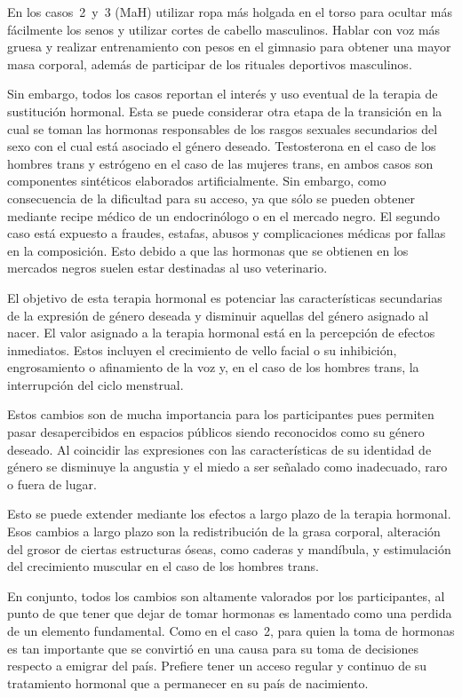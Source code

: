 En los casos~2~y~3 (MaH) utilizar ropa más holgada en el torso para ocultar más
fácilmente los senos y utilizar cortes de cabello masculinos. Hablar con voz más
gruesa y realizar entrenamiento con pesos en el gimnasio para obtener una mayor
masa corporal, además de participar de los rituales deportivos masculinos.

Sin embargo, todos los casos reportan el interés y uso eventual de la terapia de
sustitución hormonal. Esta se puede considerar otra etapa de la transición en la
cual se toman las hormonas responsables de los rasgos sexuales secundarios del
sexo con el cual está asociado el género deseado. Testosterona en el caso de los
hombres trans y estrógeno en el caso de las mujeres trans, en ambos casos son
componentes sintéticos elaborados artificialmente. Sin embargo, como
consecuencia de la dificultad para su acceso, ya que sólo se pueden obtener
mediante recipe médico de un endocrinólogo o en el mercado negro. El segundo
caso está expuesto a fraudes, estafas, abusos y complicaciones médicas por
fallas en la composición. Esto debido a que las hormonas que se obtienen en los
mercados negros suelen estar destinadas al uso veterinario.

El objetivo de esta terapia hormonal es potenciar las características
secundarias de la expresión de género deseada y disminuir aquellas del género
asignado al nacer. El valor asignado a la terapia hormonal está en la percepción
de efectos inmediatos. Estos incluyen el crecimiento de vello facial o su
inhibición, engrosamiento o afinamiento de la voz y, en el caso de los hombres
trans, la interrupción del ciclo menstrual.

Estos cambios son de mucha importancia para los participantes pues permiten
pasar desapercibidos en espacios públicos siendo reconocidos como su género
deseado. Al coincidir las expresiones con las características de su identidad de
género se disminuye la angustia y el miedo a ser señalado como inadecuado, raro
o fuera de lugar.

Esto se puede extender mediante los efectos a largo plazo de la terapia
hormonal. Esos cambios a largo plazo son la redistribución de la grasa corporal,
alteración del grosor de ciertas estructuras óseas, como caderas y mandíbula, y
estimulación del crecimiento muscular en el caso de los hombres trans.

En conjunto, todos los cambios son altamente valorados por los participantes, al
punto de que tener que dejar de tomar hormonas es lamentado como una perdida de
un elemento fundamental. Como en el caso~2, para quien la toma de hormonas es
tan importante que se convirtió en una causa para su toma de decisiones respecto
a emigrar del país. Prefiere tener un acceso regular y continuo de su
tratamiento hormonal que a permanecer en su país de nacimiento.

